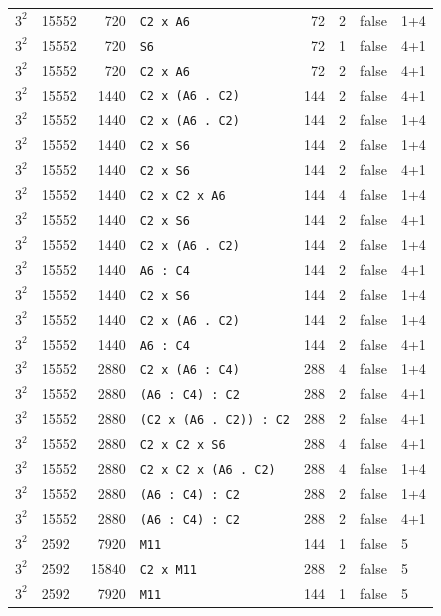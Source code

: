 \begin{longtable}{llrlrrll}
$3^2$ & 15552 & 720 & \texttt{C2 x A6} & 72 & 2 & false & 1+4\\
$3^2$ & 15552 & 720 & \texttt{S6} & 72 & 1 & false & 4+1\\
$3^2$ & 15552 & 720 & \texttt{C2 x A6} & 72 & 2 & false & 4+1\\
$3^2$ & 15552 & 1440 & \texttt{C2 x (A6 . C2)} & 144 & 2 & false & 4+1\\
$3^2$ & 15552 & 1440 & \texttt{C2 x (A6 . C2)} & 144 & 2 & false & 1+4\\
$3^2$ & 15552 & 1440 & \texttt{C2 x S6} & 144 & 2 & false & 1+4\\
$3^2$ & 15552 & 1440 & \texttt{C2 x S6} & 144 & 2 & false & 4+1\\
$3^2$ & 15552 & 1440 & \texttt{C2 x C2 x A6} & 144 & 4 & false & 1+4\\
$3^2$ & 15552 & 1440 & \texttt{C2 x S6} & 144 & 2 & false & 4+1\\
$3^2$ & 15552 & 1440 & \texttt{C2 x (A6 . C2)} & 144 & 2 & false & 1+4\\
$3^2$ & 15552 & 1440 & \texttt{A6 : C4} & 144 & 2 & false & 4+1\\
$3^2$ & 15552 & 1440 & \texttt{C2 x S6} & 144 & 2 & false & 1+4\\
$3^2$ & 15552 & 1440 & \texttt{C2 x (A6 . C2)} & 144 & 2 & false & 1+4\\
$3^2$ & 15552 & 1440 & \texttt{A6 : C4} & 144 & 2 & false & 4+1\\
$3^2$ & 15552 & 2880 & \texttt{C2 x (A6 : C4)} & 288 & 4 & false & 1+4\\
$3^2$ & 15552 & 2880 & \texttt{(A6 : C4) : C2} & 288 & 2 & false & 4+1\\
$3^2$ & 15552 & 2880 & \texttt{(C2 x (A6 . C2)) : C2} & 288 & 2 & false & 4+1\\
$3^2$ & 15552 & 2880 & \texttt{C2 x C2 x S6} & 288 & 4 & false & 4+1\\
$3^2$ & 15552 & 2880 & \texttt{C2 x C2 x (A6 . C2)} & 288 & 4 & false & 1+4\\
$3^2$ & 15552 & 2880 & \texttt{(A6 : C4) : C2} & 288 & 2 & false & 1+4\\
$3^2$ & 15552 & 2880 & \texttt{(A6 : C4) : C2} & 288 & 2 & false & 4+1\\
$3^2$ & 2592 & 7920 & \texttt{M11} & 144 & 1 & false & 5\\
$3^2$ & 2592 & 15840 & \texttt{C2 x M11} & 288 & 2 & false & 5\\
$3^2$ & 2592 & 7920 & \texttt{M11} & 144 & 1 & false & 5\\

\end{longtable}
